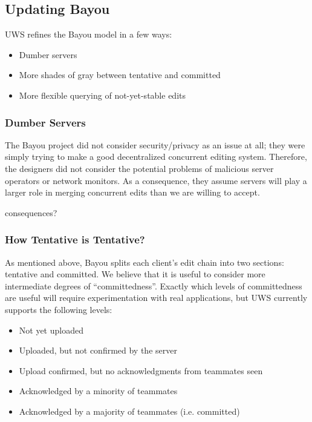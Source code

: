 \documentclass{article}
\begin{document}
\subsection{Updating Bayou}

UWS refines the Bayou model in a few ways:

\begin{itemize}
\item Dumber servers
\item More shades of gray between tentative and committed
\item More flexible querying of not-yet-stable edits
\end{itemize}

\subsubsection{Dumber Servers}

The Bayou project did not consider security/privacy as an issue at all; they were simply trying to make a good decentralized concurrent editing system.
Therefore, the designers did not consider the potential problems of malicious server operators or network monitors.
As a consequence, they assume servers will play a larger role in merging concurrent edits than we are willing to accept.

consequences?

\subsubsection{How Tentative is Tentative?}

As mentioned above, Bayou splits each client's edit chain into two sections: tentative and committed.
We believe that it is useful to consider more intermediate degrees of ``committedness''.
Exactly which levels of committedness are useful will require experimentation with real applications, but UWS currently supports the following levels:

\begin{itemize}
\item Not yet uploaded
\item Uploaded, but not confirmed by the server
\item Upload confirmed, but no acknowledgments from teammates seen
\item Acknowledged by a minority of teammates
\item Acknowledged by a majority of teammates (i.e. committed)
\end{itemize}
\end{document}
